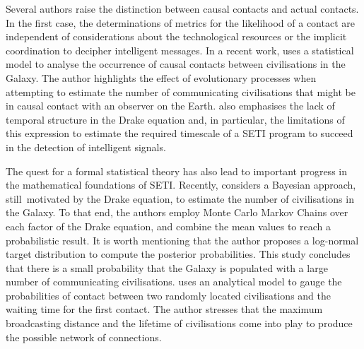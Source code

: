 \documentclass[crop]{CSLB}
\begin{document}
Several authors raise the distinction between causal contacts and
actual contacts.
%
In the first case, the determinations of metrics for the likelihood of
a contact are independent of considerations about the technological
resources or the implicit coordination to decipher intelligent
messages.
%
In a recent work, \citet{balbi_impact_2018} uses a statistical model to
analyse the occurrence of causal contacts between civilisations in the
Galaxy.
%
The author highlights the effect of evolutionary processes when
attempting to estimate the number of communicating civilisations that
might be in causal contact with an observer on the Earth.
%
\citet{cirkovic_temporal_2004} also emphasises the lack of temporal
structure in the Drake equation and, in particular, the limitations
of this expression to estimate the required timescale of a SETI
program to succeed in the detection of intelligent signals.




The quest for a formal statistical theory has also lead 
to important progress in the mathematical foundations of SETI.
%
Recently, \citet{bloetscher_using_2019} considers a Bayesian approach,
still motivated by the Drake equation, to estimate
the number of civilisations in the Galaxy.
%
To that end, the authors employ Monte Carlo Markov Chains over each factor
of the Drake equation, and combine the mean values to reach a probabilistic
result.
%
It is worth mentioning that the author proposes a log-normal target
distribution to compute the posterior probabilities.
%
This study concludes that there is a small probability that the Galaxy
is populated with a large number of communicating civilisations.
%
\citet{smith_broadcasting_2009} uses an analytical model to gauge the
probabilities of contact between two randomly located civilisations
and the waiting time for the first contact.
%
The author stresses that 
the maximum broadcasting distance and the lifetime of civilisations
come into play to produce the possible network of connections.
\end{document}
